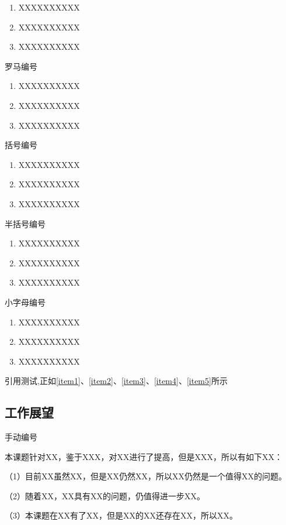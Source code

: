 \begin{enumerate}
 \item XXXXXXXXXX
 \label{item1}
 \item XXXXXXXXXX
 \item XXXXXXXXXX
\end{enumerate}
罗马编号
\begin{enumerate}[label=(\roman*)]
 \item XXXXXXXXXX
 \label{item2}
 \item XXXXXXXXXX
 \item XXXXXXXXXX
\end{enumerate}
括号编号
\begin{enumerate}[label=(\arabic*)]
 \item XXXXXXXXXX
 \label{item3}
 \item XXXXXXXXXX
 \item XXXXXXXXXX
\end{enumerate}
半括号编号
\begin{enumerate}[label=\arabic*)]
 \item XXXXXXXXXX
 \label{item4}
 \item XXXXXXXXXX
 \item XXXXXXXXXX
\end{enumerate}
小字母编号
\begin{enumerate}[label=\alph*)]
 \item XXXXXXXXXX
 \label{item5}
 \item XXXXXXXXXX
 \item XXXXXXXXXX
\end{enumerate}

引用测试,正如\ref{item1}、\ref{item2}、\ref{item3}、\ref{item4}、\ref{item5}所示

\subsection{工作展望}
手动编号 %
\par
本课题针对XX，鉴于XXX，对XX进行了提高，但是XXX，所以有如下XX：

（1）目前XX虽然XX，但是XX仍然XX，所以XX仍然是一个值得XX的问题。

（2）随着XX，XX具有XX的问题，仍值得进一步XX。

（3）本课题在XX有了XX，但是XX的XX还存在XX，所以XX。

\clearpage
